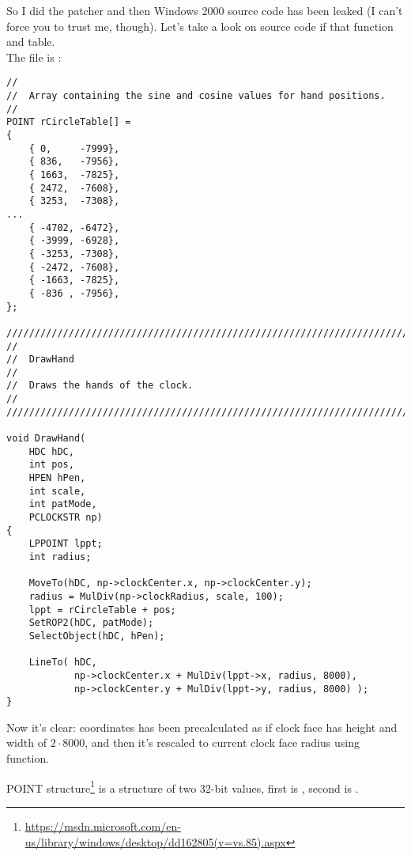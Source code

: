 So I did the patcher and then Windows 2000 source code has been leaked (I can't force you to trust me, though).
Let's take a look on source code if that function and table.\\
The file is :

\begin{lstlisting}[style=customc]
//
//  Array containing the sine and cosine values for hand positions.
//
POINT rCircleTable[] =
{
    { 0,     -7999},
    { 836,   -7956},
    { 1663,  -7825},
    { 2472,  -7608},
    { 3253,  -7308},
...
    { -4702, -6472},
    { -3999, -6928},
    { -3253, -7308},
    { -2472, -7608},
    { -1663, -7825},
    { -836 , -7956},
};

////////////////////////////////////////////////////////////////////////////
//
//  DrawHand
//
//  Draws the hands of the clock.
//
////////////////////////////////////////////////////////////////////////////

void DrawHand(
    HDC hDC,
    int pos,
    HPEN hPen,
    int scale,
    int patMode,
    PCLOCKSTR np)
{
    LPPOINT lppt;
    int radius;

    MoveTo(hDC, np->clockCenter.x, np->clockCenter.y);
    radius = MulDiv(np->clockRadius, scale, 100);
    lppt = rCircleTable + pos;
    SetROP2(hDC, patMode);
    SelectObject(hDC, hPen);

    LineTo( hDC,
            np->clockCenter.x + MulDiv(lppt->x, radius, 8000),
            np->clockCenter.y + MulDiv(lppt->y, radius, 8000) );
}
\end{lstlisting}

Now it's clear: coordinates has been precalculated as if clock face has height and width of $2 \cdot 8000$,
and then it's rescaled to current clock face radius using  function.

POINT structure\footnote{\url{https://msdn.microsoft.com/en-us/library/windows/desktop/dd162805(v=vs.85).aspx}}
is a structure of two 32-bit values, first is , second is .

